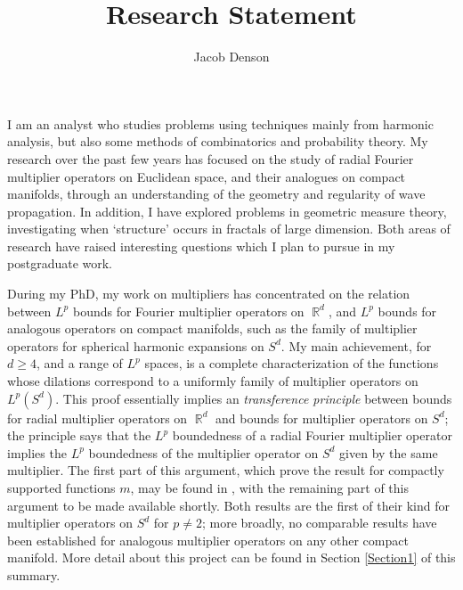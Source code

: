 \documentclass[11pt]{article}
\title{\vspace{-3.5em}Research Statement}
\author{Jacob Denson}
\date{}
\DeclareMathOperator{\RR}{\mathbb{R}}
\begin{document}
\maketitle

\vspace{-1em}

I am an analyst who studies problems using techniques mainly from harmonic analysis, but also some methods of combinatorics and probability theory. My research over the past few years has focused on the study of radial Fourier multiplier operators on Euclidean space, and their analogues on compact manifolds, through an understanding of the geometry and regularity of wave propagation. In addition, I have explored problems in geometric measure theory, investigating when `structure' occurs in fractals of large dimension. Both areas of research have raised interesting questions which I plan to pursue in my postgraduate work.

During my PhD, my work on multipliers has concentrated on the relation between $L^p$ bounds for Fourier multiplier operators on $\RR^d$, and $L^p$ bounds for analogous operators on compact manifolds, such as the family of multiplier operators for spherical harmonic expansions on $S^d$. My main achievement, for $d \geq 4$, and a range of $L^p$ spaces, is a complete characterization of the functions whose dilations correspond to a uniformly family of multiplier operators on $L^p(S^d)$. This proof essentially implies an \emph{transference principle} between bounds for radial multiplier operators on $\RR^d$ and bounds for multiplier operators on $S^d$; the principle says that the $L^p$ boundedness of a radial Fourier multiplier operator implies the $L^p$ boundedness of the multiplier operator on $S^d$ given by the same multiplier. %
The first part of this argument, which prove the result for compactly supported functions $m$, may be found in \cite{DensonCharacterization}, with the remaining part of this argument to be made available shortly. Both results are the first of their kind for multiplier operators on $S^d$ for $p \neq 2$; more broadly, no comparable results have been established for analogous multiplier operators on any other compact manifold. More detail about this project can be found in Section \ref{Section1} of this summary.

%
%
%
%
\end{document}
